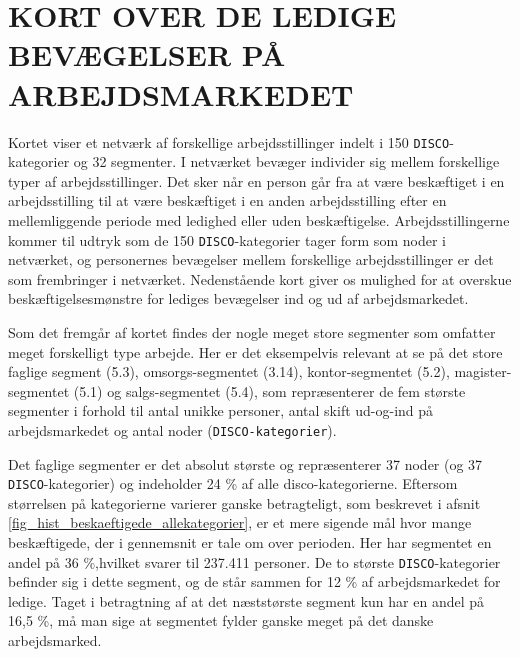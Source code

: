 


\section{KORT OVER DE LEDIGE BEVÆGELSER PÅ ARBEJDSMARKEDET \label{}}

Kortet viser et netværk af forskellige arbejdsstillinger indelt i 150 \texttt{DISCO}-kategorier og 32 segmenter. I netværket bevæger individer sig mellem forskellige typer af arbejdsstillinger. Det sker når en person går fra at være beskæftiget i en arbejdsstilling til at være beskæftiget i en anden arbejdsstilling efter en mellemliggende periode med ledighed eller uden beskæftigelse. Arbejdsstillingerne kommer til udtryk som de 150 \texttt{DISCO}-kategorier  tager form som noder i netværket, og personernes bevægelser mellem forskellige arbejdsstillinger er det som frembringer  i netværket. Nedenstående kort giver os mulighed for at overskue beskæftigelsesmønstre for lediges bevægelser ind og ud af arbejdsmarkedet.
% 

Som det fremgår af kortet findes der nogle meget store segmenter som omfatter meget forskelligt type arbejde. Her er det eksempelvis relevant at se på det store faglige segment (5.3), omsorgs-segmentet (3.14), kontor-segmentet (5.2), magister-segmentet (5.1) og salgs-segmentet (5.4), som repræsenterer de fem største segmenter i forhold til antal unikke personer, antal skift ud-og-ind på arbejdsmarkedet og antal noder (\texttt{DISCO-kategorier}). 

Det faglige segmenter er det absolut største og repræsenterer 37 noder (og 37 \texttt{DISCO}-kategorier) og indeholder 24 \% af alle disco-kategorierne. Eftersom størrelsen på kategorierne varierer ganske betragteligt, som beskrevet i afsnit \ref{fig_hist_beskaeftigede_allekategorier}, er et mere sigende mål hvor mange beskæftigede, der i gennemsnit er tale om over perioden. Her har segmentet en andel på 36 \%,hvilket svarer til 237.411 personer. De to største \texttt{DISCO}-kategorier befinder sig i dette segment, og de står sammen for 12 \% af arbejdsmarkedet for ledige. Taget i betragtning af at det næststørste segment kun har en andel på 16,5 \%, må man sige at segmentet fylder ganske meget på det danske arbejdsmarked. 


